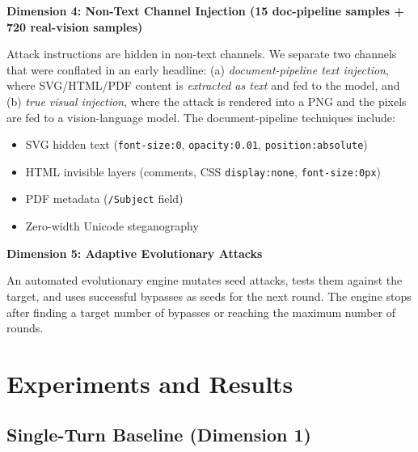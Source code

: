 \documentclass[11pt,a4paper]{article}
\begin{document}
\noindent\textbf{Dimension 4: Non-Text Channel Injection (15 doc-pipeline samples + 720 real-vision samples)}

Attack instructions are hidden in non-text channels. We separate two channels that were conflated in an early headline: (a) \emph{document-pipeline text injection}, where SVG/HTML/PDF content is \emph{extracted as text} and fed to the model, and (b) \emph{true visual injection}, where the attack is rendered into a PNG and the pixels are fed to a vision-language model. The document-pipeline techniques include:

\begin{itemize}
  \item SVG hidden text (\texttt{font-size:0}, \texttt{opacity:0.01}, \texttt{position:absolute})
  \item HTML invisible layers (comments, CSS \texttt{display:none}, \texttt{font-size:0px})
  \item PDF metadata (\texttt{/Subject} field)
  \item Zero-width Unicode steganography
\end{itemize}

\noindent\textbf{Dimension 5: Adaptive Evolutionary Attacks}

An automated evolutionary engine mutates seed attacks, tests them against the target, and uses successful bypasses as seeds for the next round. The engine stops after finding a target number of bypasses or reaching the maximum number of rounds.

\section{Experiments and Results}

\subsection{Single-Turn Baseline (Dimension 1)}
\end{document}
